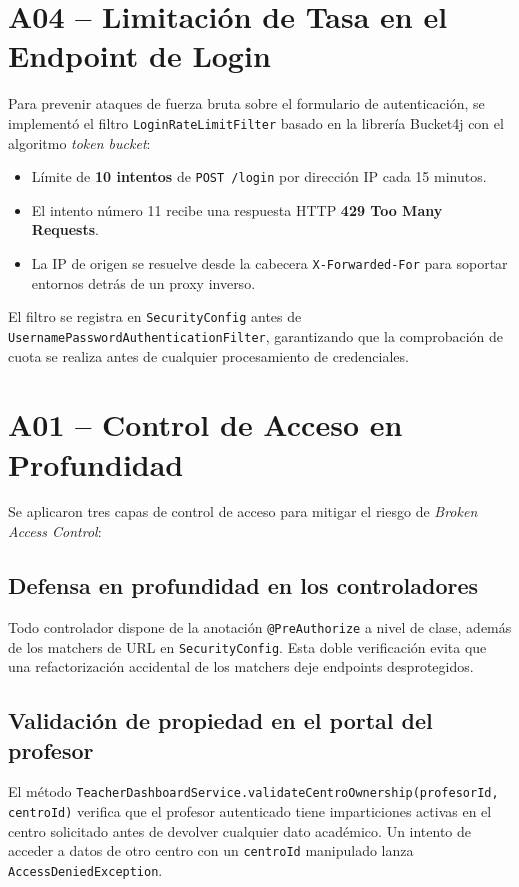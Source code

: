 \documentclass[12pt, a4paper]{report}
\begin{document}
\section{A04 -- Limitación de Tasa en el Endpoint de Login}

Para prevenir ataques de fuerza bruta sobre el formulario de autenticación, se implementó el filtro \texttt{LoginRateLimitFilter} basado en la librería Bucket4j con el algoritmo \textit{token bucket}:

\begin{itemize}
  \item Límite de \textbf{10 intentos} de \texttt{POST /login} por dirección IP cada 15 minutos.
  \item El intento número 11 recibe una respuesta HTTP \textbf{429 Too Many Requests}.
  \item La IP de origen se resuelve desde la cabecera \texttt{X-Forwarded-For} para soportar entornos detrás de un proxy inverso.
\end{itemize}

El filtro se registra en \texttt{SecurityConfig} antes de \texttt{UsernamePasswordAuthenticationFilter}, garantizando que la comprobación de cuota se realiza antes de cualquier procesamiento de credenciales.

\section{A01 -- Control de Acceso en Profundidad}

Se aplicaron tres capas de control de acceso para mitigar el riesgo de \textit{Broken Access Control}:

\subsection{Defensa en profundidad en los controladores}

Todo controlador dispone de la anotación \texttt{@PreAuthorize} a nivel de clase, además de los matchers de URL en \texttt{SecurityConfig}. Esta doble verificación evita que una refactorización accidental de los matchers deje endpoints desprotegidos.

\subsection{Validación de propiedad en el portal del profesor}

El método \texttt{TeacherDashboardService.validateCentroOwnership(profesorId, centroId)} verifica que el profesor autenticado tiene imparticiones activas en el centro solicitado antes de devolver cualquier dato académico. Un intento de acceder a datos de otro centro con un \texttt{centroId} manipulado lanza \texttt{AccessDeniedException}.
\end{document}
